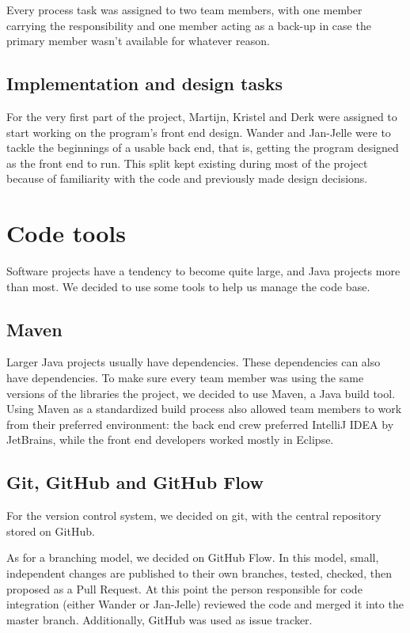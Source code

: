 Every process task was assigned to two team members, with one member carrying the responsibility and one member acting as a back-up in case the primary member wasn't available for whatever reason.

\subsection{Implementation and design tasks}

For the very first part of the project, Martijn, Kristel and Derk were assigned to start working on the program's front end design. Wander and Jan-Jelle were to tackle the beginnings of a usable back end, that is, getting the program designed as the front end to run. This split kept existing during most of the project because of familiarity with the code and previously made design decisions.

\section{Code tools}

Software projects have a tendency to become quite large, and Java projects more than most. We decided to use some tools to help us manage the code base.

\subsection{Maven}

Larger Java projects usually have dependencies. These dependencies can also have dependencies. To make sure every team member was using the same versions of the libraries the project, we decided to use Maven, a Java build tool. Using Maven as a standardized build process also allowed team members to work from their preferred environment: the back end crew preferred IntelliJ IDEA by JetBrains, while the front end developers worked mostly in Eclipse. 

\subsection{Git, GitHub and GitHub Flow}

For the version control system, we decided on git, with the central repository stored on GitHub.  

As for a branching model, we decided on GitHub Flow\cite{githubflow}. In this model, small, independent changes are published to their own branches, tested, checked, then proposed as a Pull Request. At this point the person responsible for code integration (either Wander or Jan-Jelle) reviewed the code and merged it into the master branch.  Additionally, GitHub was used as issue tracker.

